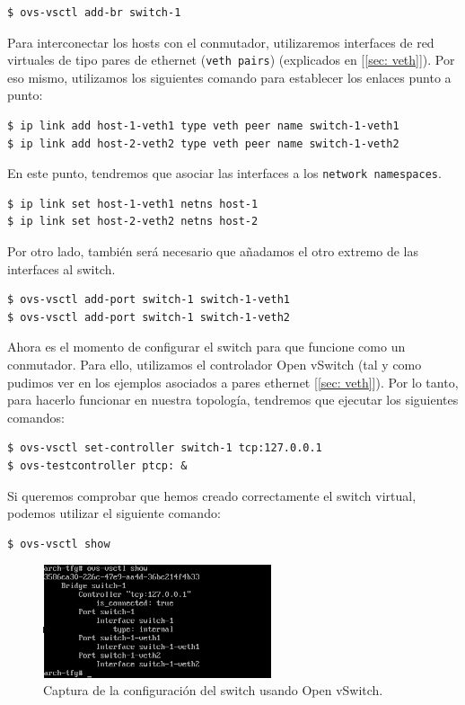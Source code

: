 \documentclass[a4paper, oneside, 12pt]{book}
\begin{document}
	\begin{verbatim}
$ ovs-vsctl add-br switch-1
	\end{verbatim}

	\noindent Para interconectar los hosts con el conmutador, utilizaremos interfaces de red virtuales de tipo pares de ethernet (\texttt{veth pairs}) (explicados en [\ref{sec: veth}]). Por eso mismo, utilizamos los siguientes comando para establecer los enlaces punto a punto:
	
	\begin{verbatim}
$ ip link add host-1-veth1 type veth peer name switch-1-veth1
$ ip link add host-2-veth2 type veth peer name switch-1-veth2
	\end{verbatim}

	\pagebreak

	\noindent En este punto, tendremos que asociar las interfaces a los \texttt{network namespaces}.
	
	\begin{verbatim}
$ ip link set host-1-veth1 netns host-1
$ ip link set host-2-veth2 netns host-2
	\end{verbatim}

	\noindent Por otro lado, también será necesario que añadamos el otro extremo de las interfaces al switch.
	
	\begin{verbatim}
$ ovs-vsctl add-port switch-1 switch-1-veth1
$ ovs-vsctl add-port switch-1 switch-1-veth2
	\end{verbatim}

	\noindent Ahora es el momento de configurar el switch para que funcione como un conmutador. Para ello, utilizamos el controlador Open vSwitch (tal y como pudimos ver en los ejemplos asociados a pares ethernet [\ref{sec: veth}]). Por lo tanto, para hacerlo funcionar en nuestra topología, tendremos que ejecutar los siguientes comandos:
	
	\begin{verbatim}
$ ovs-vsctl set-controller switch-1 tcp:127.0.0.1
$ ovs-testcontroller ptcp: &
	\end{verbatim}

	\noindent Si queremos comprobar que hemos creado correctamente el switch virtual, podemos utilizar el siguiente comando:
	
	\begin{verbatim}
$ ovs-vsctl show
	\end{verbatim}
	
	\begin{figure}[h!]
		\begin{center}
			\includegraphics[width=0.6\textwidth]{img/ns_single_1.png}
			\caption{Captura de la configuración del switch usando Open vSwitch.}
		\end{center}
	\end{figure}
	
\end{document}
